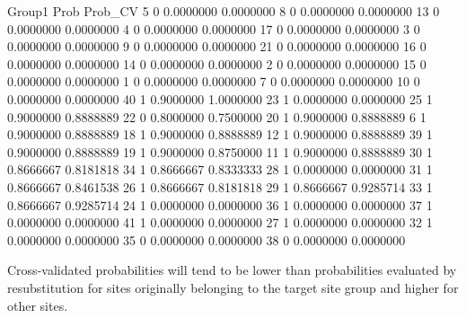 \documentclass[11pt,a4paper]{article}
\begin{document}
\begin{Schunk}
\begin{Soutput}
   Group1      Prob   Prob_CV
5       0 0.0000000 0.0000000
8       0 0.0000000 0.0000000
13      0 0.0000000 0.0000000
4       0 0.0000000 0.0000000
17      0 0.0000000 0.0000000
3       0 0.0000000 0.0000000
9       0 0.0000000 0.0000000
21      0 0.0000000 0.0000000
16      0 0.0000000 0.0000000
14      0 0.0000000 0.0000000
2       0 0.0000000 0.0000000
15      0 0.0000000 0.0000000
1       0 0.0000000 0.0000000
7       0 0.0000000 0.0000000
10      0 0.0000000 0.0000000
40      1 0.9000000 1.0000000
23      1 0.0000000 0.0000000
25      1 0.9000000 0.8888889
22      0 0.8000000 0.7500000
20      1 0.9000000 0.8888889
6       1 0.9000000 0.8888889
18      1 0.9000000 0.8888889
12      1 0.9000000 0.8888889
39      1 0.9000000 0.8888889
19      1 0.9000000 0.8750000
11      1 0.9000000 0.8888889
30      1 0.8666667 0.8181818
34      1 0.8666667 0.8333333
28      1 0.0000000 0.0000000
31      1 0.8666667 0.8461538
26      1 0.8666667 0.8181818
29      1 0.8666667 0.9285714
33      1 0.8666667 0.9285714
24      1 0.0000000 0.0000000
36      1 0.0000000 0.0000000
37      1 0.0000000 0.0000000
41      1 0.0000000 0.0000000
27      1 0.0000000 0.0000000
32      1 0.0000000 0.0000000
35      0 0.0000000 0.0000000
38      0 0.0000000 0.0000000
\end{Soutput}
\end{Schunk}
Cross-validated probabilities will tend to be lower than probabilities evaluated by resubstitution for sites originally belonging to the target site group and higher for other sites.


\end{document}
